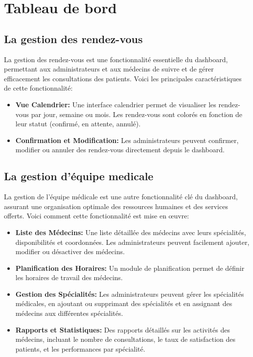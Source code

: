 \section{Tableau de bord}

\subsection{La gestion des rendez-vous}

\hspace {16pt}La gestion des rendez-vous est une fonctionnalité essentielle du dashboard, permettant aux administrateurs et aux médecins de suivre et de gérer efficacement les consultations des patients. Voici les principales caractéristiques de cette fonctionnalité:

\begin{itemize}
  \item \textbf{Vue Calendrier: }Une interface calendrier permet de visualiser les rendez-vous par jour, semaine ou mois. Les rendez-vous sont colorés en fonction de leur statut (confirmé, en attente, annulé).
  \item \textbf{Confirmation et Modification: }Les administrateurs peuvent confirmer, modifier ou annuler des rendez-vous directement depuis le dashboard.
\end{itemize}

\subsection{La gestion d'équipe medicale}

\hspace{16pt} La gestion de l’équipe médicale est une autre fonctionnalité clé du dashboard, assurant une organisation optimale des ressources humaines et des services offerts. Voici comment cette fonctionnalité est mise en œuvre:

\begin{itemize}
  \item \textbf{Liste des Médecins: }Une liste détaillée des médecins avec leurs spécialités, disponibilités et coordonnées. Les administrateurs peuvent facilement ajouter, modifier ou désactiver des médecins.
  \item \textbf{Planification des Horaires: }Un module de planification permet de définir les horaires de travail des médecins.
  \item \textbf{Gestion des Spécialités: }Les administrateurs peuvent gérer les spécialités médicales, en ajoutant ou supprimant des spécialités et en assignant des médecins aux différentes spécialités.
  \item \textbf{Rapports et Statistiques: }Des rapports détaillés sur les activités des médecins, incluant le nombre de consultations, le taux de satisfaction des patients, et les performances par spécialité.
\end{itemize}

